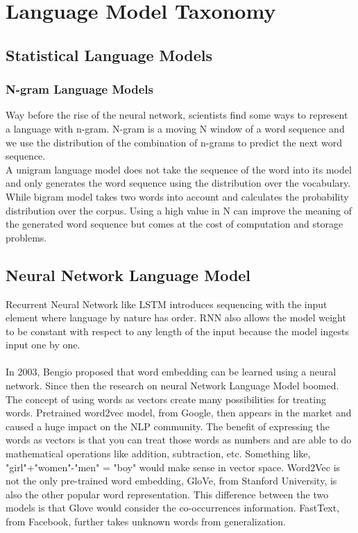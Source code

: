 \documentclass[a4paper, 11pt]{article}
\begin{document}
\section{Language Model Taxonomy}

\subsection{Statistical Language Models}

\subsubsection{N-gram Language Models}
Way before the rise of the neural network, scientists find some ways to represent a language with n-gram. N-gram is a moving N window of a word sequence and we use the distribution of the combination of n-grams to predict the next word sequence. \\

A unigram language model does not take the sequence of the word into its model and only generates the word sequence using the distribution over the vocabulary. While bigram model takes two words into account and calculates the probability distribution over the corpus. Using a high value in N can improve the meaning of the generated word sequence but comes at the cost of computation and storage problems.

\subsection{Neural Network Language Model}

Recurrent Neural Network like LSTM\cite{LSTM} introduces sequencing with the input element where language by nature has order. RNN also allows the model weight to be constant with respect to any length of the input because the model ingests input one by one.  \\
\\
In 2003, Bengio\cite{10.5555/944919.944966} proposed that word embedding can be learned using a neural network. Since then the research on neural Network Language Model boomed. The concept of using words as vectors create many possibilities for treating words. Pretrained word2vec\cite{mikolov2013efficient} model, from Google, then appears in the market and caused a huge impact on the NLP community. The benefit of expressing the words as vectors is that you can treat those words as numbers and are able to do mathematical operations like addition, subtraction, etc. Something like, "girl"+"women"-"men" = "boy" would make sense in vector space. Word2Vec is not the only pre-trained word embedding, GloVe\cite{pennington2014glove}, from Stanford University, is also the other popular word representation. This difference between the two models is that Glove would consider the co-occurrences information. FastText\cite{FastText}, from Facebook, further takes unknown words from generalization. 
\end{document}
